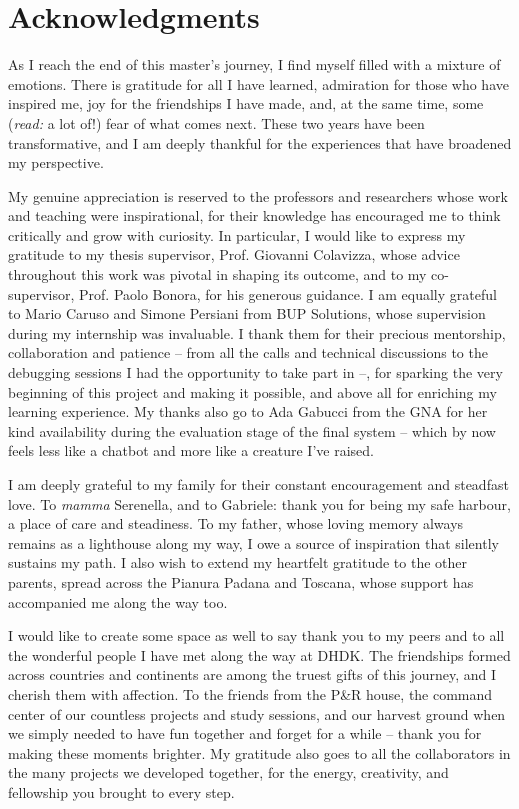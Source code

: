 \chapter{Acknowledgments}

\begin{spacing}{1.5}
As I reach the end of this master’s journey, I find myself filled with a mixture of emotions. There is gratitude for all I have learned, admiration for those who have inspired me, joy for the friendships I have made, and, at the same time, some (\textit{read:} a lot of!) fear of what comes next. These two years have been transformative, and I am deeply thankful for the experiences that have broadened my perspective.

My genuine appreciation is reserved to the professors and researchers whose work and teaching were inspirational, for their knowledge has encouraged me to think critically and grow with curiosity. In particular, I would like to express my gratitude to my thesis supervisor, Prof. Giovanni Colavizza, whose advice throughout this work was pivotal in shaping its outcome, and to my co-supervisor, Prof. Paolo Bonora, for his generous guidance. I am equally grateful to Mario Caruso and Simone Persiani from BUP Solutions, whose supervision during my internship was invaluable. I thank them for their precious mentorship, collaboration and patience -- from all the calls and technical discussions to the debugging sessions I had the opportunity to take part in --, for sparking the very beginning of this project and making it possible, and above all for enriching my learning experience. My thanks also go to Ada Gabucci from the GNA for her kind availability during the evaluation stage of the final system -- which by now feels less like a chatbot and more like a creature I’ve raised.

I am deeply grateful to my family for their constant encouragement and steadfast love. To \textit{mamma} Serenella, and to Gabriele: thank you for being my safe harbour, a place of care and steadiness. To my father, whose loving memory always remains as a lighthouse along my way, I owe a source of inspiration that silently sustains my path. I also wish to extend my heartfelt gratitude to the other parents, spread across the Pianura Padana and Toscana, whose support has accompanied me along the way too.

I would like to create some space as well to say thank you to my peers and to all the wonderful people I have met along the way at DHDK. The friendships formed across countries and continents are among the truest gifts of this journey, and I cherish them with affection. To the friends from the P\&R house, the command center of our countless projects and study sessions, and our harvest ground when we simply needed to have fun together and forget for a while -- thank you for making these moments brighter. My gratitude also goes to all the collaborators in the many projects we developed together, for the energy, creativity, and fellowship you brought to every step.


\end{spacing}
